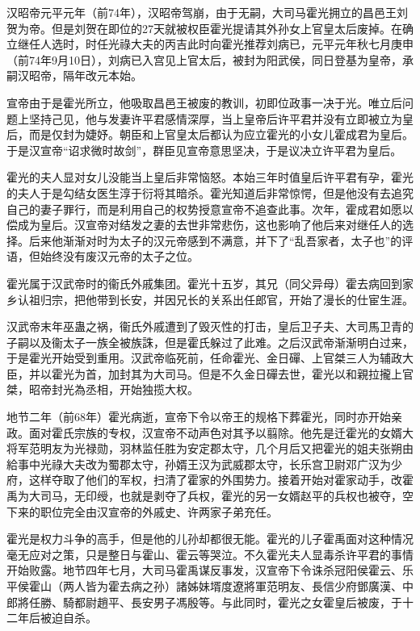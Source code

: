 汉昭帝元平元年（前74年），汉昭帝驾崩，由于无嗣，大司马霍光拥立的昌邑王刘贺为帝。但是刘贺在即位的27天就被权臣霍光提请其外孙女上官皇太后废掉。在确立继任人选时，时任光祿大夫的丙吉此时向霍光推荐刘病已，元平元年秋七月庚申（前74年9月10日），刘病已入宫见上官太后，被封为阳武侯，同日登基为皇帝，承嗣汉昭帝，隔年改元本始。

宣帝由于是霍光所立，他吸取昌邑王被废的教训，初即位政事一决于光。唯立后问题上坚持己见，他与发妻许平君感情深厚，当上皇帝后许平君并没有立即被立为皇后，而是仅封为婕妤。朝臣和上官皇太后都认为应立霍光的小女儿霍成君为皇后。于是汉宣帝“诏求微时故剑”，群臣见宣帝意思坚决，于是议决立许平君为皇后。

霍光的夫人显对女儿没能当上皇后非常恼怒。本始三年时值皇后许平君有孕，霍光的夫人于是勾结女医生淳于衍将其暗杀。霍光知道后非常惊愕，但是他没有去追究自己的妻子罪行，而是利用自己的权势授意宣帝不追查此事。次年，霍成君如愿以偿成为皇后。汉宣帝对结发之妻的去世非常悲伤，这也影响了他后来对继任人的选择。后来他渐渐对时为太子的汉元帝感到不满意，并下了“乱吾家者，太子也”的评语，但始终没有废汉元帝的太子之位。

霍光属于汉武帝时的衞氏外戚集团。霍光十五岁，其兄（同父异母）霍去病回到家乡认祖归宗，把他带到长安，并因兄长的关系出任郎官，开始了漫长的仕宦生涯。

汉武帝末年巫蛊之祸，衞氏外戚遭到了毁灭性的打击，皇后卫子夫、大司馬卫青的子嗣以及衞太子一族全被族誅，但是霍氏躲过了此难。之后汉武帝渐渐明白过来，于是霍光开始受到重用。汉武帝临死前，任命霍光、金日磾、上官桀三人为辅政大臣，并以霍光为首，加封其为大司马。但是不久金日磾去世，霍光以和親拉攏上官桀，昭帝封光為丞相，开始独揽大权。

地节二年（前68年）霍光病逝，宣帝下令以帝王的规格下葬霍光，同时亦开始亲政。面对霍氏宗族的专权，汉宣帝不动声色对其予以翦除。他先是迁霍光的女婿大将军范明友为光禄勋，羽林监任胜为安定郡太守，几个月后又把霍光的姐夫张朔由給事中光祿大夫改为蜀郡太守，孙婿王汉为武威郡太守，长乐宫卫尉邓广汉为少府，这样夺取了他们的军权，扫清了霍家的外围势力。接着开始对霍家动手，改霍禹为大司马，无印绶，也就是剥夺了兵权，霍光的另一女婿赵平的兵权也被夺，空下来的职位完全由汉宣帝的外戚史、许两家子弟充任。

霍光是权力斗争的高手，但是他的儿孙却都很无能。霍光的儿子霍禹面对这种情况毫无应对之策，只是整日与霍山、霍云等哭泣。不久霍光夫人显毒杀许平君的事情开始败露。地节四年七月，大司马霍禹谋反事发，汉宣帝下令诛杀冠阳侯霍云、乐平侯霍山（两人皆为霍去病之孙）諸姊妹壻度遼將軍范明友、長信少府鄧廣漢、中郎將任勝、騎都尉趙平、長安男子馮殷等。与此同时，霍光之女霍皇后被废，于十二年后被迫自杀。

